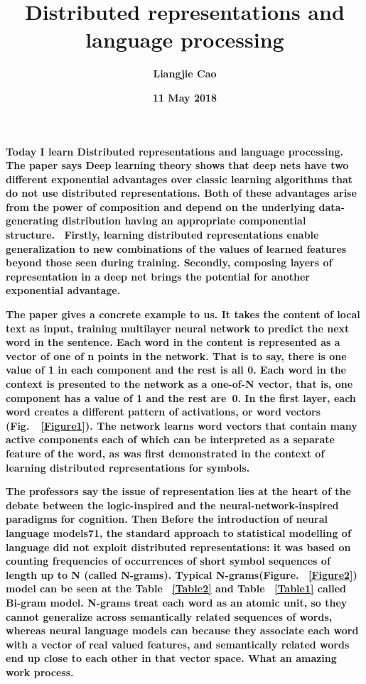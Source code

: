 \documentclass[35pt]{article}
\begin{document}
\title{\textbf{Distributed representations and language processing}}
\author{\textbf{Liangjie Cao}}
\date{\textbf{11 May 2018}}
\maketitle
\par
\textbf{Today I learn Distributed representations and language processing. The paper says Deep learning theory shows that deep nets have two different exponential advantages over classic learning algorithms that do not use distributed representations. Both of these advantages arise from the power of composition and depend on the underlying data-generating distribution having an appropriate componential structure.~\cite{name1} Firstly, learning distributed representations enable generalization to new combinations of the values of learned features beyond those seen during training. Secondly, composing layers of representation in a deep net brings the potential for another exponential advantage.}
\par
\textbf{The paper gives a concrete example to us. It takes the content of local text as input, training multilayer neural network to predict the next word in the sentence. Each word in the content is represented as a vector of one of n points in the network. That is to say, there is one value of 1 in each component and the rest is all 0. Each word in the context is presented to the network as a one-of-N vector, that is, one component has a value of 1 and the rest are 0. In the first layer, each word creates a different pattern of activations, or word vectors (Fig. ~\ref{Figure1}). The network learns word vectors that contain many active components each of which can be interpreted as a separate feature of the word, as was first demonstrated in the context of learning distributed representations for symbols. }
\par
\textbf{The professors say the issue of representation lies at the heart of the debate between the logic-inspired and the neural-network-inspired paradigms for cognition. Then Before the introduction of neural language models71, the standard approach to statistical modelling of language did not exploit distributed representations: it was based on counting frequencies of occurrences of short symbol sequences of length up to N (called N-grams). Typical N-grams(Figure. ~\ref{Figure2}) model can be seen at the Table ~\ref{Table2} and Table ~\ref{Table1} called Bi-gram model. N-grams treat each word as an atomic unit, so they cannot generalize across semantically related sequences of words, whereas neural language models can because they associate each word with a vector of real valued features, and semantically related words end up close to each other in that vector space. What an amazing work process.}
\end{document}

